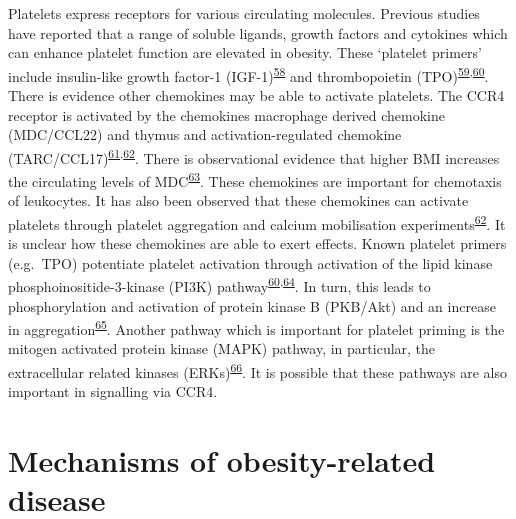 \documentclass[11pt,twoside]{bristolthesis}
\begin{document}
Platelets express receptors for various circulating molecules. Previous studies have reported that a range of soluble ligands, growth factors and cytokines which can enhance platelet function are elevated in obesity. These `platelet primers' include insulin-like growth factor-1 (IGF-1)\textsuperscript{\protect\hyperlink{ref-Frystyk1995}{58}} and thrombopoietin (TPO)\textsuperscript{\protect\hyperlink{ref-Maury2010a}{59},\protect\hyperlink{ref-Blair2015}{60}}. There is evidence other chemokines may be able to activate platelets. The CCR4 receptor is activated by the chemokines macrophage derived chemokine (MDC/CCL22) and thymus and activation-regulated chemokine (TARC/CCL17)\textsuperscript{\protect\hyperlink{ref-Kowalska2000}{61},\protect\hyperlink{ref-Abi-Younes2001}{62}}. There is observational evidence that higher BMI increases the circulating levels of MDC\textsuperscript{\protect\hyperlink{ref-Kitahara2014}{63}}. These chemokines are important for chemotaxis of leukocytes. It has also been observed that these chemokines can activate platelets through platelet aggregation and calcium mobilisation experiments\textsuperscript{\protect\hyperlink{ref-Abi-Younes2001}{62}}. It is unclear how these chemokines are able to exert effects. Known platelet primers (e.g.~TPO) potentiate platelet activation through activation of the lipid kinase phosphoinositide-3-kinase (PI3K) pathway\textsuperscript{\protect\hyperlink{ref-Blair2015}{60},\protect\hyperlink{ref-Pasquet2000}{64}}. In turn, this leads to phosphorylation and activation of protein kinase B (PKB/Akt) and an increase in aggregation\textsuperscript{\protect\hyperlink{ref-Hemmings2015}{65}}. Another pathway which is important for platelet priming is the mitogen activated protein kinase (MAPK) pathway, in particular, the extracellular related kinases (ERKs)\textsuperscript{\protect\hyperlink{ref-Ezumi1998}{66}}. It is possible that these pathways are also important in signalling via CCR4.

\hypertarget{mechanisms-of-obesity-related-disease}{%
\section{Mechanisms of obesity-related disease}\label{mechanisms-of-obesity-related-disease}}
\end{document}
